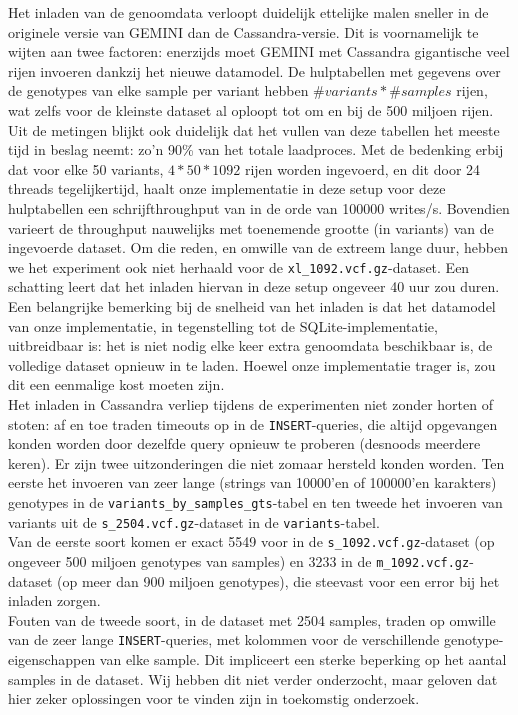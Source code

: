 Het inladen van de genoomdata verloopt duidelijk ettelijke malen sneller in de originele versie van GEMINI dan de Cassandra-versie. Dit is voornamelijk te wijten aan twee factoren: enerzijds moet GEMINI met Cassandra gigantische veel rijen invoeren dankzij het nieuwe datamodel. De hulptabellen met gegevens over de genotypes van elke sample per variant hebben $\#variants * \#samples$ rijen, wat zelfs voor de kleinste dataset al oploopt tot om en bij de 500 miljoen rijen. Uit de metingen blijkt ook duidelijk dat het vullen van deze tabellen het meeste tijd in beslag neemt: zo'n 90\% van het totale laadproces. Met de bedenking erbij dat voor elke 50 variants, $4 * 50 * 1092$ rijen worden ingevoerd, en dit door 24 threads tegelijkertijd, haalt onze implementatie in deze setup voor deze hulptabellen een schrijfthroughput van in de orde van 100000 writes/s. Bovendien varieert de throughput nauwelijks met toenemende grootte (in variants) van de ingevoerde dataset. Om die reden, en omwille van de extreem lange duur, hebben we het experiment ook niet herhaald voor de \texttt{xl\_1092.vcf.gz}-dataset. Een schatting leert dat het inladen hiervan in deze setup ongeveer 40 uur zou duren.\\
Een belangrijke bemerking bij de snelheid van het inladen is dat het datamodel van onze implementatie, in tegenstelling tot de SQLite-implementatie, uitbreidbaar is: het is niet nodig elke keer extra genoomdata beschikbaar is, de volledige dataset opnieuw in te laden. Hoewel onze implementatie trager is, zou dit een eenmalige kost moeten zijn.\\

Het inladen in Cassandra verliep tijdens de experimenten niet zonder horten of stoten: af en toe traden timeouts op in de \texttt{INSERT}-queries, die altijd opgevangen konden worden door dezelfde query opnieuw te proberen (desnoods meerdere keren). Er zijn twee uitzonderingen die niet zomaar hersteld konden worden. Ten eerste het invoeren van zeer lange (strings van 10000'en of 100000'en karakters) genotypes in de \texttt{variants\_by\_samples\_gts}-tabel en ten tweede het invoeren van variants uit de \texttt{s\_2504.vcf.gz}-dataset in de \texttt{variants}-tabel.\\
Van de eerste soort komen er exact 5549 voor in de \texttt{s\_1092.vcf.gz}-dataset (op ongeveer 500 miljoen genotypes van samples) en 3233 in de \texttt{m\_1092.vcf.gz}-dataset (op meer dan 900 miljoen genotypes), die steevast voor een error bij het inladen zorgen.\\
Fouten van de tweede soort, in de dataset met 2504 samples, traden op omwille van de zeer lange \texttt{INSERT}-queries, met kolommen voor de verschillende genotype-eigenschappen van elke sample. Dit impliceert een sterke beperking op het aantal samples in de dataset. Wij hebben dit niet verder onderzocht, maar geloven dat hier zeker oplossingen voor te vinden zijn in toekomstig onderzoek.

